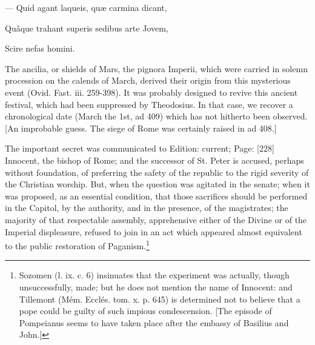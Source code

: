 {\texthebrew{—} Quid agant laqueis, quæ carmina dicant,

Quâque trahant superis sedibus arte Jovem,

Scire nefas homini.

The ancilia, or shields of Mars, the pignora Imperii, which were carried in solemn procession on the calends of March, derived their origin from this mysterious event (Ovid. Fast. iii. 259-398). It was probably designed to revive this ancient festival, which had been suppressed by Theodosius. In that case, we recover a chronological date (March the 1st, ad 409) which has not hitherto been observed. [An improbable guess. The siege of Rome was certainly raised in ad 408.]} The important secret was communicated to Edition: current; Page: [228] Innocent, the bishop of Rome; and the successor of St. Peter is accused, perhaps without foundation, of preferring the safety of the republic to the rigid severity of the Christian worship. But, when the question was agitated in the senate; when it was proposed, as an essential condition, that those sacrifices should be performed in the Capitol, by the authority, and in the presence, of the magistrates; the majority of that respectable assembly, apprehensive either of the Divine or of the Imperial displeasure, refused to join in an act which appeared almost equivalent to the public restoration of Paganism.\footnote{Sozomen (l. ix. c. 6) insinuates that the experiment was actually, though unsuccessfully, made; but he does not mention the name of Innocent: and Tillemont (Mém. Ecclés. tom. x. p. 645) is determined not to believe that a pope could be guilty of such impious condescension. [The episode of Pompeianus seems to have taken place after the embassy of Basilius and John.]}

